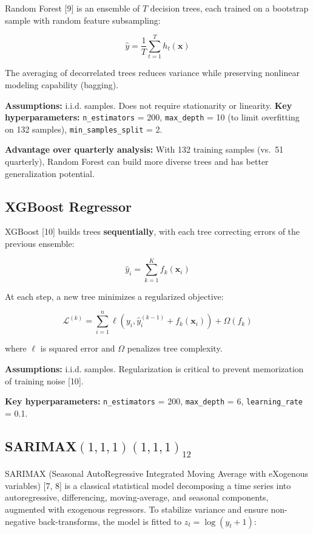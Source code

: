 \documentclass[
]{article}
\begin{document}
Random Forest {[}9{]} is an ensemble of \(T\) decision trees, each
trained on a bootstrap sample with random feature subsampling:

\[\hat{y} = \frac{1}{T} \sum_{t=1}^{T} h_t(\mathbf{x})\]

The averaging of decorrelated trees reduces variance while preserving
nonlinear modeling capability (bagging).

\textbf{Assumptions:} i.i.d. samples. Does not require stationarity or
linearity. \textbf{Key hyperparameters:} \texttt{n\_estimators} = 200,
\texttt{max\_depth} = 10 (to limit overfitting on 132 samples),
\texttt{min\_samples\_split} = 2.

\textbf{Advantage over quarterly analysis:} With 132 training samples
(vs.~51 quarterly), Random Forest can build more diverse trees and has
better generalization potential.

\subsection{XGBoost Regressor}\label{xgboost-regressor}

XGBoost {[}10{]} builds trees \textbf{sequentially}, with each tree
correcting errors of the previous ensemble:

\[\hat{y}_i = \sum_{k=1}^{K} f_k(\mathbf{x}_i)\]

At each step, a new tree minimizes a regularized objective:

\[\mathcal{L}^{(k)} = \sum_{i=1}^{n} \ell(y_i, \hat{y}_i^{(k-1)} + f_k(\mathbf{x}_i)) + \Omega(f_k)\]

where \(\ell\) is squared error and \(\Omega\) penalizes tree
complexity.

\textbf{Assumptions:} i.i.d. samples. Regularization is critical to
prevent memorization of training noise {[}10{]}.

\textbf{Key hyperparameters:} \texttt{n\_estimators} = 200,
\texttt{max\_depth} = 6, \texttt{learning\_rate} = 0.1.

\subsection{\texorpdfstring{SARIMAX\((1,1,1)(1,1,1)_{12}\)}{SARIMAX(1,1,1)(1,1,1)\_\{12\}}}\label{sarimax111111_12}

SARIMAX (Seasonal AutoRegressive Integrated Moving Average with
eXogenous variables) {[}7, 8{]} is a classical statistical model
decomposing a time series into autoregressive, differencing,
moving-average, and seasonal components, augmented with exogenous
regressors. To stabilize variance and ensure non-negative
back-transforms, the model is fitted to \(z_t = \log(y_t + 1)\):
\end{document}
